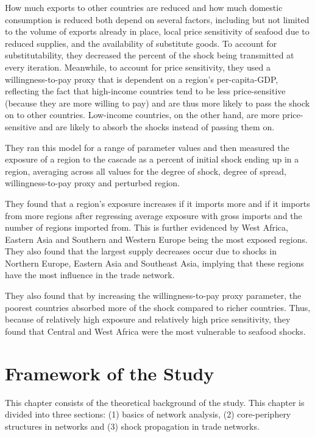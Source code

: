 \documentclass[12pt,letterpaper]{report}
\begin{document}
	How much exports to other countries are reduced and how much domestic consumption is reduced both depend on several factors, including but not limited to the volume of exports already in place, local price sensitivity of seafood due to reduced supplies, and the availability of substitute goods. To account for substitutability, they decreased the percent of the shock being transmitted at every iteration. Meanwhile, to account for price sensitivity, they used a willingness-to-pay proxy that is dependent on a region's per-capita-GDP, reflecting the fact that high-income countries tend to be less price-sensitive (because they are more willing to pay) and are thus more likely to pass the shock on to other countries. Low-income countries, on the other hand, are more price-sensitive and are likely to absorb the shocks instead of passing them on.
	
	They ran this model for a range of parameter values and then measured the exposure of a region to the cascade as a percent of initial shock ending up in a region, averaging across all values for the degree of shock, degree of spread, willingness-to-pay proxy and perturbed region. 
	
	They found that a region's exposure increases if it imports more and if it imports from more regions after regressing average exposure with gross imports and the number of regions imported from. This is further evidenced by West Africa, Eastern Asia and Southern and Western Europe being the most exposed regions. They also found that the largest supply decreases occur due to shocks in Northern Europe, Eastern Asia and Southeast Asia, implying that these regions have the most influence in the trade network.
	
	They also found that by increasing the willingness-to-pay proxy parameter, the poorest countries absorbed more of the shock compared to richer countries. Thus, because of relatively high exposure and relatively high price sensitivity, they found that Central and West Africa were the most vulnerable to seafood shocks.

\chapter{Framework of the Study}
\label{chap:3Framework}

This chapter consists of the theoretical background of the study. This chapter is divided into three sections: (1) basics of network analysis, (2) core-periphery structures in networks and (3) shock propagation in trade networks.
\end{document}
